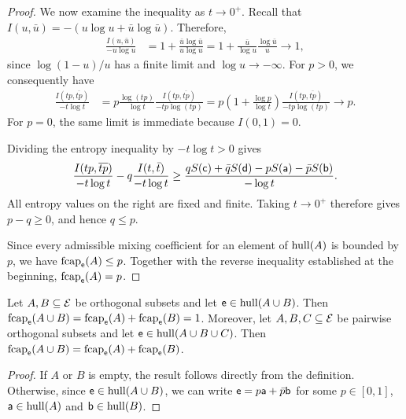 \begin{mathSection}
\begin{proof}
	We now examine the inequality as $t \to 0^+$. Recall that $I(u,\bar{u}) = -(u\log u + \bar{u}\log\bar{u})$. Therefore,
	\begin{equation}
		\begin{aligned}
			\frac{I(u,\bar{u})}{-u\log u}
			&= 1+\frac{\bar{u}\log\bar{u}}{u\log u} = 1+\frac{\bar{u}}{\log u}
			\frac{\log\bar{u}}{u}
			\to 1,
		\end{aligned}
	\end{equation}
	since $\log(1-u)/u$ has a finite limit and $\log u \to -\infty$. For $p>0$, we consequently have
	\begin{equation}
		\begin{aligned}
			\frac{I(tp,\overline{tp})}{-t\log t}
			&= p\frac{\log(tp)}{\log t}
			\frac{I(tp,\overline{tp})}{-tp\log(tp)} = p\left(1+\frac{\log p}{\log t}\right)
			\frac{I(tp,\overline{tp})}{-tp\log(tp)}
			\to p.
		\end{aligned}
	\end{equation}
	For $p=0$, the same limit is immediate because $I(0,1)=0$.
	
	Dividing the entropy inequality by $-t\log t>0$ gives
	\begin{equation}
		\frac{I(tp,\overline{tp})}{-t\log t}
		- q\frac{I(t,\bar{t})}{-t\log t}
		\geq
		\frac{q S(\ens[c]) + \bar{q} S(\ens[d])
			- p S(\ens[a]) - \bar{p} S(\ens[b])}{-\log t}.
	\end{equation}
	All entropy values on the right are fixed and finite. Taking $t \to 0^+$ therefore gives $p-q \geq 0$, and hence $q \leq p$.
	
	Since every admissible mixing coefficient for an element of $\hull(A)$ is bounded by $p$, we have $\fcap_{\ens}(A) \leq p$. Together with the reverse inequality established at the beginning, $\fcap_{\ens}(A) = p$.
\end{proof}

\begin{prop}
	Let $A,B \subseteq \Ens$ be orthogonal subsets and let $\ens \in \hull(A \cup B)$. Then $\fcap_{\ens}(A \cup B) = \fcap_{\ens}(A)+\fcap_{\ens}(B) = 1$. Moreover, let $A,B,C \subseteq \Ens$ be pairwise orthogonal subsets and let $\ens \in \hull(A\cup B\cup C)$. Then $\fcap_{\ens}(A \cup B) = \fcap_{\ens}(A) + \fcap_{\ens}(B)$.
\end{prop}

\begin{proof}
	If $A$ or $B$ is empty, the result follows directly from the definition. Otherwise, since $\ens \in \hull(A \cup B)$, we can write $\ens = p\ens[a] + \bar{p}\ens[b]$ for some $p \in [0,1]$, $\ens[a] \in \hull(A)$ and $\ens[b] \in \hull(B)$.
	

\end{proof}
\end{mathSection}
